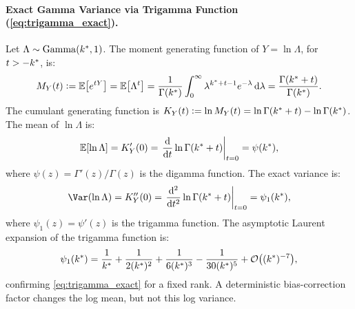 \paragraph{Exact Gamma Variance via Trigamma Function
(\cref{eq:trigamma_exact}).}
Let $\Lambda \sim \mathrm{Gamma}(k^{*}, 1)$. The moment generating
function of $Y = \ln\Lambda$, for $t>-k^{*}$, is:
\begin{equation}
  M_Y(t) \mathrel{\mathop:}= \mathbb{E}\bigl[e^{t Y}\bigr] =
  \mathbb{E}\bigl[\Lambda^t\bigr] =
  \frac{1}{\Gamma(k^{*})}\int_0^\infty \lambda^{k^{*} + t -
  1}e^{-\lambda}\,\mathrm{d}\lambda = \frac{\Gamma(k^{*} +
  t)}{\Gamma(k^{*})}.
\end{equation}
The cumulant generating function is $K_Y(t) \mathrel{\mathop:}= \ln M_Y(t) =
\ln\Gamma(k^{*} + t) - \ln\Gamma(k^{*})$.
The mean of $\ln\Lambda$ is:
\begin{equation}
  \mathbb{E}[\ln\Lambda] = K_Y'(0) = \left.
  \frac{\mathrm{d}}{\mathrm{d}t}\ln\Gamma(k^{*} + t) \right|_{t=0}
  = \psi(k^{*}),
\end{equation}
where $\psi(z) = \Gamma'(z)/\Gamma(z)$ is the digamma function. The
exact variance is:
\begin{equation}
  \Var(\ln\Lambda) = K_Y''(0) = \left.
  \frac{\mathrm{d}^2}{\mathrm{d}t^2}\ln\Gamma(\kstar + t)
  \right|_{t=0} = \psi_1(\kstar),
\end{equation}
where $\psi_1(z) = \psi'(z)$ is the trigamma function.
The asymptotic Laurent expansion of the trigamma function is:
\begin{equation}
  \psi_1(k^{*}) = \frac{1}{k^{*}} + \frac{1}{2(k^{*})^2} +
  \frac{1}{6(k^{*})^3} - \frac{1}{30(k^{*})^5} +
  \mathcal{O}\bigl((k^{*})^{-7}\bigr),
\end{equation}
confirming \cref{eq:trigamma_exact} for a fixed rank. A deterministic
bias-correction factor changes the log mean, but not this log variance.

